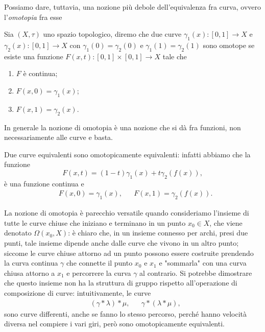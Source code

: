 Possiamo dare, tuttavia, una nozione più debole dell'equivalenza fra curva, ovvero l'\emph{omotopia} fra esse

\begin{definition}
    Sia $(X, \tau)$ uno spazio topologico, diremo che due curve $\gamma_1(x):[0,1] \to X$ e $\gamma_2(x):[0,1] \to X$ con $\gamma_1(0) = \gamma_2(0)$ e $\gamma_1(1) = \gamma_2(1)$ sono omotope se esiste una funzione $F(x,t) : [0, 1] \times [0,1] \to X$ tale che
    \begin{enumerate}
        \item $F$ è continua;
        \item $F(x, 0) = \gamma_1(x)$;
        \item $F(x, 1) = \gamma_2(x)$.
    \end{enumerate}
\end{definition}
\begin{remark}
    In generale la nozione di omotopia è una nozione che si dà fra funzioni, non necessariamente alle curve e basta.
\end{remark}
\begin{remark}
    Due curve equivalenti sono omotopicamente equivalenti: infatti abbiamo che la funzione
    $$
        F(x, t) = (1-t)\gamma_1(x) + t\gamma_2(f(x)),
    $$
    è una funzione continua e
    \begin{align}
        &F(x, 0) = \gamma_1(x),& &F(x, 1) = \gamma_2(f(x)).
    \end{align}
\end{remark}

La nozione di omotopia è parecchio versatile quando consideriamo l'insieme di tutte le curve chiuse che iniziano e terminano in un punto $x_0 \in X$, che viene denotato $\Omega(x_0, X)$: è chiaro che, in un insieme connesso per archi,
presi due punti, tale insieme dipende anche dalle curve che vivono in un altro punto; siccome le curve chiuse attorno ad un punto possono essere costruite prendendo la curva continua $\gamma$ che connette il punto $x_0$ e $x_1$ e "sommarla" con una curva chiusa attorno a $x_1$ e
percorrere la curva $\gamma$ al contrario. Si potrebbe dimostrare che questo insieme non ha la struttura di gruppo rispetto all'operazione di composizione di curve: intuitivamente, le curve
\begin{align}
    &(\gamma \ast \lambda) \ast \mu, & &\gamma \ast (\lambda \ast \mu),
\end{align}
sono curve differenti, anche se fanno lo stesso percorso, perché hanno velocità diversa nel compiere i vari giri, però sono omotopicamente equivalenti.

